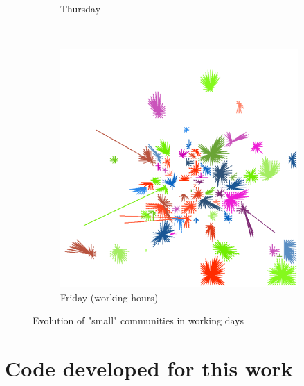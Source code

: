 \documentclass[12pt,a4paper]{article}
\begin{document}
\begin{figure}[H]
\begin{subfigure}[b]{0.48\textwidth}
\caption{Thursday}
\end{subfigure}
\\
\begin{subfigure}[b]{0.48\textwidth}
\includegraphics[width=\textwidth]{weekDef/edges-5Fri-small.png}
\caption{Friday (working hours)}
\end{subfigure}

\caption{Evolution of "small" communities in working days}
\end{figure}


\section{Code developed for this work}
\end{document}
